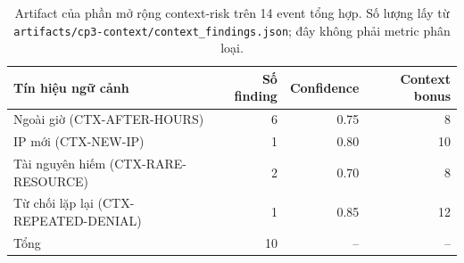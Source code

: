 \begin{table}[t]
  \centering
  \caption{Artifact của phần mở rộng context-risk trên 14 event tổng hợp. Số lượng lấy từ \texttt{artifacts/cp3-context/context\_findings.json}; đây không phải metric phân loại.}
  \label{tab:context-findings}
  \begin{tabular}{lrrr}
    \toprule
    Tín hiệu ngữ cảnh & Số finding & Confidence & Context bonus \\
    \midrule
    Ngoài giờ (CTX-AFTER-HOURS) & 6 & 0.75 & 8 \\
    IP mới (CTX-NEW-IP) & 1 & 0.80 & 10 \\
    Tài nguyên hiếm (CTX-RARE-RESOURCE) & 2 & 0.70 & 8 \\
    Từ chối lặp lại (CTX-REPEATED-DENIAL) & 1 & 0.85 & 12 \\
    \midrule
    Tổng & 10 & -- & -- \\
    \bottomrule
  \end{tabular}
\end{table}
